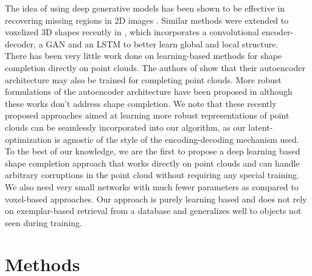\documentclass[10pt,twocolumn,letterpaper]{article}
\begin{document}
The idea of using deep generative models has been shown to be effective in recovering missing regions in 2D images \cite{inpainting} \cite{glob_local_img_comp}. Similar methods were extended to voxelized 3D shapes recently in \cite{3dinpainting}, which incorporates a convolutional encoder-decoder, a GAN and an LSTM to better learn global and local structure.\\
There has been very little work done on learning-based methods for shape completion directly on point clouds. The authors of \cite{latentgan} show that their autoencoder architecture may also be trained for completing point clouds. More robust formulations of the autoencoder architecture have been proposed in \cite{foldingnet,neighbours} although these works don't address shape completion. We note that these recently proposed approaches aimed at learning more robust representations of point clouds can be seamlessly incorporated into our algorithm, as our latent-optimization is agnostic of the style of the encoding-decoding mechanism used.
To the best of our knowledge, we are the first to propose a deep learning based shape completion approach that works directly on point clouds and can handle arbitrary corruptions in the point cloud without requiring any special training. We also need very small networks with much fewer parameters as compared to voxel-based approaches. Our approach is purely learning based and does not rely on exemplar-based retrieval from a database and generalizes well to objects not seen during training.
\section{Methods}
\end{document}
